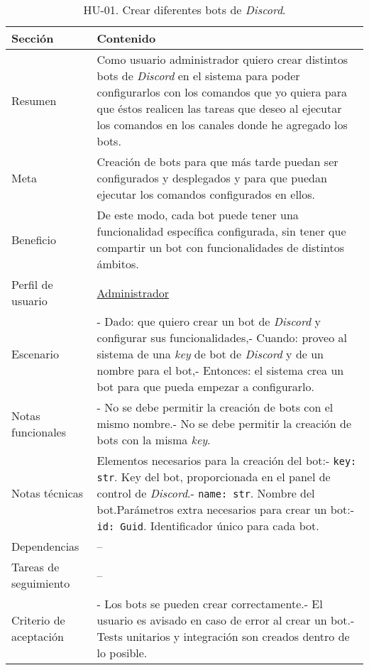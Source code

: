 \begin{table}[H]
    \centering
    \def\arraystretch{1.25}
    \begin{adjustbox}{max width=\textwidth}
    \begin{tabularx}{\textwidth}{l|L}
    \hline
        \textbf{Sección} & \textbf{Contenido} \\ \hline
    \hline
        Resumen & Como usuario administrador quiero crear distintos bots de \textit{Discord} en el sistema para poder configurarlos con los comandos que yo quiera para que éstos realicen las tareas que deseo al ejecutar los comandos en los canales donde he agregado los bots. \\ \hline
        Meta & Creación de bots para que más tarde puedan ser configurados y desplegados y para que puedan ejecutar los comandos configurados en ellos. \\ \hline
        Beneficio & De este modo, cada bot puede tener una funcionalidad específica configurada, sin tener que compartir un bot con funcionalidades de distintos ámbitos. \\ \hline
        Perfil de usuario & \hyperref[sec:personaAdmin]{Administrador} \\ \hline
        Escenario & - Dado: que quiero crear un bot de \textit{Discord} y configurar sus funcionalidades,\linebreak - Cuando: proveo al sistema de una \textit{key} de bot de \textit{Discord} y de un nombre para el bot,\linebreak - Entonces: el sistema crea un bot para que pueda empezar a configurarlo. \\ \hline
        Notas funcionales & - No se debe permitir la creación de bots con el mismo nombre.\linebreak - No se debe permitir la creación de bots con la misma \textit{key}. \\ \hline
        Notas técnicas & Elementos necesarios para la creación del bot:\linebreak - \verb|key: str|. Key del bot, proporcionada en el panel de control de \textit{Discord}.\linebreak - \verb|name: str|. Nombre del bot.\linebreak \linebreak Parámetros extra necesarios para crear un bot:\linebreak - \verb|id: Guid|. Identificador único para cada bot. \\ \hline
        Dependencias & – \\ \hline
        Tareas de seguimiento & – \\ \hline
        Criterio de aceptación & - Los bots se pueden crear correctamente.\linebreak - El usuario es avisado en caso de error al crear un bot.\linebreak - Tests unitarios y integración son creados dentro de lo posible. \\ \hline
    \end{tabularx}
    \end{adjustbox}
    \caption{HU-01. Crear diferentes bots de \textit{Discord}.}
\end{table}


